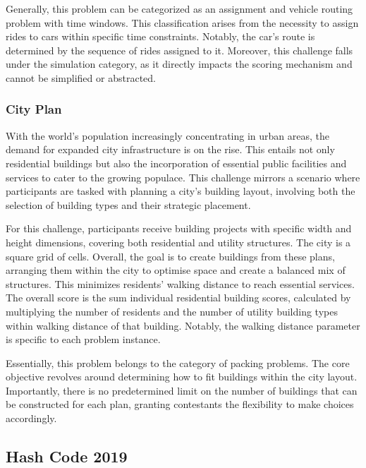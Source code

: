 Generally, this problem can be categorized as an assignment and vehicle routing
problem with time windows. This classification arises from the necessity to
assign rides to cars within specific time constraints. Notably, the car's route
is determined by the sequence of rides assigned to it. Moreover, this challenge
falls under the simulation category, as it directly impacts the scoring
mechanism and cannot be simplified or abstracted.

\subsubsection*{City Plan}
\label{subsubsec:hashcode-2018-final}

With the world's population increasingly concentrating in urban areas, the
demand for expanded city infrastructure is on the rise. This entails not only
residential buildings but also the incorporation of essential public facilities
and services to cater to the growing populace. This challenge mirrors a scenario
where participants are tasked with planning a city's building layout,
involving both the selection of building types and their strategic placement.

For this challenge, participants receive building projects with specific width and
height dimensions, covering both residential and utility structures. The city is
a square grid of cells. Overall, the goal is to create buildings from these
plans, arranging them within the city to optimise space and create a balanced
mix of structures. This minimizes residents' walking distance to reach essential
services. The overall score is the sum individual residential building scores,
calculated by multiplying the number of residents and the number of utility
building types within walking distance of that building. Notably, the walking
distance parameter is specific to each problem instance.

Essentially, this problem belongs to the category of packing problems. The core
objective revolves around determining how to fit buildings within the city
layout. Importantly, there is no predetermined limit on the number of buildings
that can be constructed for each plan, granting contestants the flexibility to
make choices accordingly.

\subsection{Hash Code 2019}
\label{subsec:hashcode-2019}

